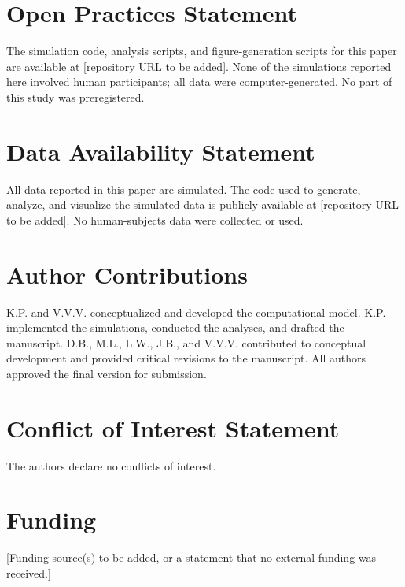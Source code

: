 \documentclass[man,12pt,floatsintext]{apa7}
\begin{document}
\section{Open Practices Statement}
The simulation code, analysis scripts, and figure-generation scripts for this
paper are available at [repository URL to be added]. None of the simulations
reported here involved human participants; all data were computer-generated.
No part of this study was preregistered.

\section{Data Availability Statement}
All data reported in this paper are simulated. The code used to generate,
analyze, and visualize the simulated data is publicly available at
[repository URL to be added]. No human-subjects data were collected or used.

\section{Author Contributions}
K.P. and V.V.V. conceptualized and developed the computational model. K.P.
implemented the simulations, conducted the analyses, and drafted the
manuscript. D.B., M.L., L.W., J.B., and V.V.V. contributed to conceptual
development and provided critical revisions to the manuscript. All authors
approved the final version for submission.

\section{Conflict of Interest Statement}
The authors declare no conflicts of interest.

\section{Funding}
[Funding source(s) to be added, or a statement that no external funding was received.]

\printbibliography
\end{document}

